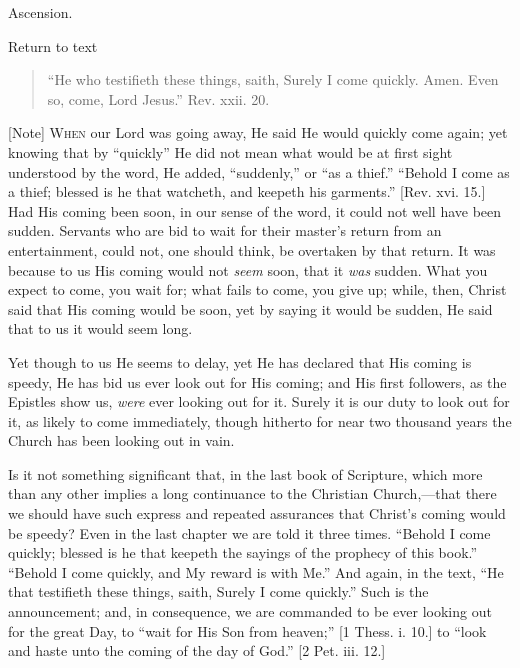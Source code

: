
Ascension.

Return to text


\begin{quote}

``He who testifieth these things, saith, Surely I come
quickly. Amen. Even so, come, Lord Jesus.'' Rev. xxii. 20.

\end{quote}

[Note] W\textsc{hen} our Lord was going
away, He said He would quickly come again; yet knowing that by
``quickly'' He did not mean what would be at first sight
understood by the word, He added, ``suddenly,'' or ``as a
thief.'' ``Behold I come as a thief; blessed is he that
watcheth, and keepeth his garments.'' [Rev. xvi. 15.] Had His
coming been soon, in our sense of the word, it could not well have
been sudden. Servants who are bid to wait for their master's return
from an entertainment, could not, one should think, be overtaken by
that return. It was because to us His coming would not \emph{seem}
soon, that it \emph{was} sudden. What you expect to come, you wait
for; what fails to come, you give up; while, then, Christ said that
His coming would be soon, yet by saying it would be sudden, He said
that to us it would seem long.

Yet though to us He seems to delay, yet He has declared that His
coming is speedy, He has bid us ever look out for His coming; and His
first followers, as the Epistles show us, \emph{were} ever looking out
for it. Surely it is our duty to look out for it, as likely to come
immediately, though hitherto for near two thousand years the Church
has been looking out in vain.

Is it not something significant that, in the last book of
Scripture, which more than any other implies a long continuance to the
Christian Church,—that there we should have such express and
repeated assurances that Christ's coming would be speedy? Even in the
last chapter we are told it three times. ``Behold I come quickly;
blessed is he that keepeth the sayings of the prophecy of this
book.'' ``Behold I come quickly, and My reward is with
Me.'' And again, in the text, ``He that testifieth these
things, saith, Surely I come quickly.'' Such is the announcement;
and, in consequence, we are commanded to be ever looking out for the
great Day, to ``wait for His Son from heaven;'' [1 Thess. i.
10.] to ``look and haste unto the coming of the day of God.''
[2 Pet. iii. 12.]

